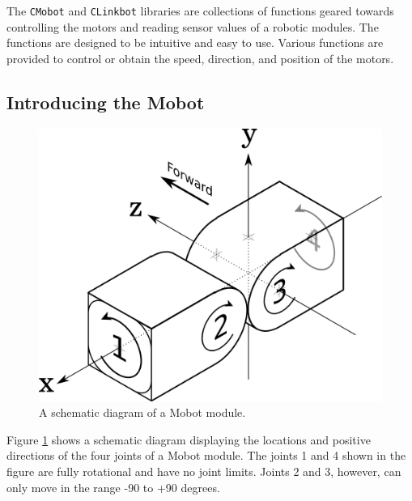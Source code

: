 \documentclass{article}
\begin{document}
The \texttt{CMobot} and \texttt{CLinkbot} libraries are collections of functions geared towards
controlling the motors and reading sensor values of a robotic modules. The
functions are designed to be intuitive
and easy to use. Various functions are provided to control or obtain the speed,
direction, and position of the motors.

\subsection{Introducing the Mobot}

\begin{figure}[H]
\begin{center}
\includegraphics[width=4.5in]{images/joint_diagram_verbose.png}
\end{center}
\caption{\label{fig:joint_diagram_verbose.png} A schematic diagram of a Mobot module.}
\end{figure}

Figure \ref{fig:joint_diagram_verbose.png} shows a schematic diagram displaying the
locations and positive directions of the four joints of a Mobot module. The
joints 1 and 4 shown in the figure are fully rotational and have no joint limits.
Joints 2 and 3, however, can only move in the range -90 to +90 degrees.
\end{document}
